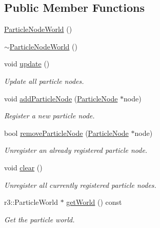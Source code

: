 \subsection*{Public Member Functions}
\begin{DoxyCompactItemize}
\item 
\mbox{\hyperlink{class_particle_node_world_a54a76a29bfc91fa573d654ba6f582568}{Particle\+Node\+World}} ()
\item 
\mbox{\hyperlink{class_particle_node_world_a7f8e2e6e6f7290c0dc62e1e5ed68ff03}{$\sim$\+Particle\+Node\+World}} ()
\item 
void \mbox{\hyperlink{class_particle_node_world_ad4ec6dd216a026ea9199a3c4b18e380b}{update}} ()
\begin{DoxyCompactList}\small\item\em Update all particle nodes. \end{DoxyCompactList}\item 
void \mbox{\hyperlink{class_particle_node_world_a384ebb3eab353b6508a4eae8d2c8ec95}{add\+Particle\+Node}} (\mbox{\hyperlink{class_particle_node}{Particle\+Node}} $\ast$node)
\begin{DoxyCompactList}\small\item\em Register a new particle node. \end{DoxyCompactList}\item 
bool \mbox{\hyperlink{class_particle_node_world_ae63b0fc7c346b724ae73a050c181d16c}{remove\+Particle\+Node}} (\mbox{\hyperlink{class_particle_node}{Particle\+Node}} $\ast$node)
\begin{DoxyCompactList}\small\item\em Unregister an already registered particle node. \end{DoxyCompactList}\item 
void \mbox{\hyperlink{class_particle_node_world_a19654bc33ccf9caa6265254e13768aa3}{clear}} ()
\begin{DoxyCompactList}\small\item\em Unregister all currently registered particle nodes. \end{DoxyCompactList}\item 
r3\+::\+Particle\+World $\ast$ \mbox{\hyperlink{class_particle_node_world_a116327867d29eedea0781ea604b499ee}{get\+World}} () const
\begin{DoxyCompactList}\small\item\em Get the particle world. \end{DoxyCompactList}\end{DoxyCompactItemize}



